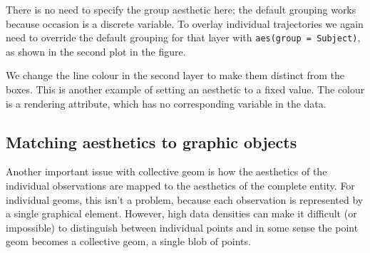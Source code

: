 \noindent There is no need to specify the group aesthetic here; the default grouping works because occasion is a discrete variable.  To overlay individual trajectories we again need to override the default grouping for that layer with {\tt aes(group = Subject)}, as shown in the second plot in the figure.

% 


We change the line colour in the second layer to make them distinct from the boxes.  This is another example of setting an aesthetic to a fixed value.  The colour is a rendering attribute, which has no corresponding variable in the data.

% 



% 


\subsection{Matching aesthetics to graphic objects}
\label{sub:matching}

Another important issue with collective geom is how the aesthetics of the individual observations are mapped to the aesthetics of the complete entity.  For individual geoms, this isn't a problem, because each observation is represented by a single graphical element.  However, high data densities can make it difficult (or impossible) to distinguish between individual points and in some sense the point geom becomes a collective geom, a single blob of points.

